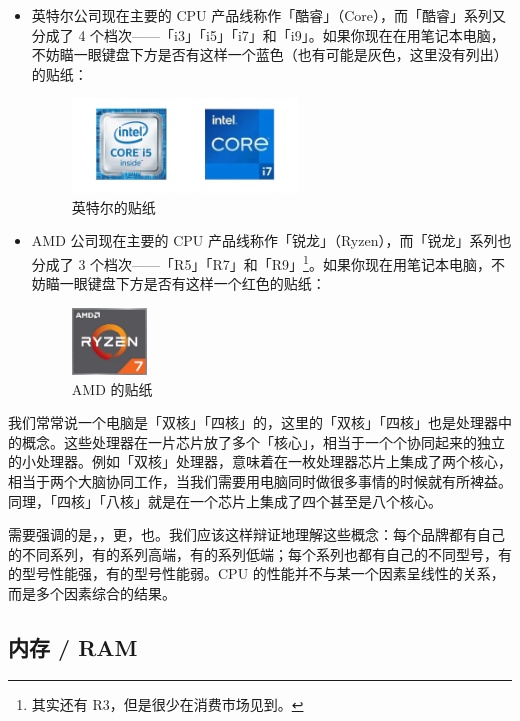 \begin{itemize}
  \item 英特尔公司现在主要的 CPU 产品线称作「酷睿」（Core），而「酷睿」系列又分成了 4 个档次——「i3」「i5」「i7」和「i9」。如果你现在在用笔记本电脑，不妨瞄一眼键盘下方是否有这样一个蓝色（也有可能是灰色，这里没有列出）的贴纸：
  \begin{figure}[H]
    \centering
    \includegraphics[width=6cm]{assets/Stickers_Intel.png}
    \caption{英特尔的贴纸}
    \label{stickers-of-intel}
  \end{figure}
  \item AMD 公司现在主要的 CPU 产品线称作「锐龙」（Ryzen），而「锐龙」系列也分成了 3 个档次——「R5」「R7」和「R9」\footnote{其实还有 R3，但是很少在消费市场见到。}。如果你现在用笔记本电脑，不妨瞄一眼键盘下方是否有这样一个红色的贴纸：
  \begin{figure}[H]
    \centering
    \includegraphics[width=2cm]{assets/Sticker_AMD.png}
    \caption{AMD 的贴纸}
    \label{sticker-of-amd}
  \end{figure}
\end{itemize}

我们常常说一个电脑是「双核」「四核」的，这里的「双核」「四核」也是处理器中的概念。这些处理器在一片芯片放了多个「核心」，相当于一个个协同起来的独立的小处理器。例如「双核」处理器，意味着在一枚处理器芯片上集成了两个核心，相当于两个大脑协同工作，当我们需要用电脑同时做很多事情的时候就有所裨益。同理，「四核」「八核」就是在一个芯片上集成了四个甚至是八个核心。

需要强调的是，，更，也。我们应该这样辩证地理解这些概念：每个品牌都有自己的不同系列，有的系列高端，有的系列低端；每个系列也都有自己的不同型号，有的型号性能强，有的型号性能弱。CPU 的性能并不与某一个因素呈线性的关系，而是多个因素综合的结果。

\subsection{内存 / RAM}

